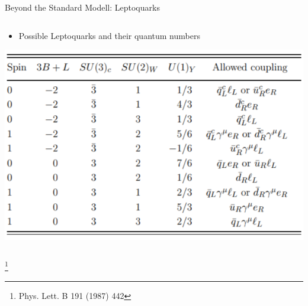 \begin{frame}{Beyond the Standard Modell: Leptoquarks}
\begin{columns}
\begin{column}{0.45\textwidth}
\begin{itemize}
                \item [] Possible Leptoquarks and their quantum numbers\footnotemark{}
            \end{itemize}
            \includegraphics[scale=0.32]{content/images/LQ-Table.PNG}
        \end{column}
    \end{columns}
    \footnote{Phys. Lett. B 191 (1987) 442}
\end{frame}

